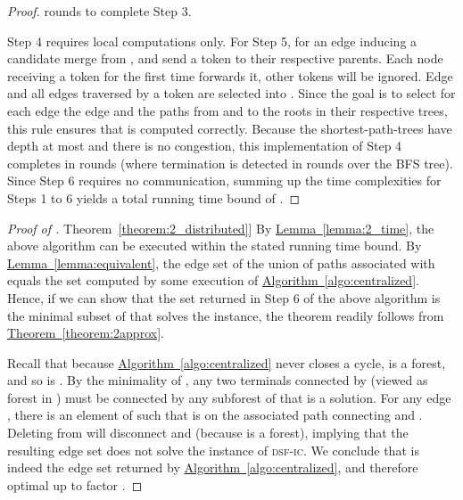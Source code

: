\documentclass[letterpaper,11pt]{article}
\newcommand{\namedref}[2]{\hyperref[#2]{#1~\ref*{#2}}}
\newcommand{\theoremref}[1]{\namedref{Theorem}{#1}}
\newcommand{\lemmaref}[1]{\namedref{Lemma}{#1}}
\newcommand{\algref}[1]{\namedref{Algorithm}{#1}}
\newcommand{\sfic}{\textsc{dsf-ic}\xspace}
\begin{document}
\begin{proof}
rounds to complete Step 3.

Step 4 requires local computations only. For Step 5, for an edge 
inducing a candidate merge from ,  and  send a token to their
respective parents. Each node receiving a token for the first time forwards it,
other tokens will be ignored. Edge  and all edges traversed by a token
are selected into . Since the goal is to select for each edge  the
edge and the paths from  and  to the roots in their respective trees, this
rule ensures that  is computed correctly. Because the shortest-path-trees
have depth at most  and there is no congestion, this implementation of Step 4
completes in  rounds (where termination is detected in
 rounds over the BFS tree). Since Step 6 requires no
communication, summing up the time complexities for Steps 1 to 6 yields a total
running time bound of .
\end{proof}
\begin{proof}[Proof of \theoremref{theorem:2_distributed}]
By \lemmaref{lemma:2_time}, the above algorithm can be executed within the
stated running time bound. By \lemmaref{lemma:equivalent}, the edge set  of
the union of paths associated with  equals the set 
computed by some execution of \algref{algo:centralized}. Hence, if we can show
that the set  returned in Step 6 of the above algorithm is the minimal subset
of  that solves the instance, the theorem readily follows from
\theoremref{theorem:2approx}.

Recall that because \algref{algo:centralized} never closes a cycle,
 is a forest, and so is . By the minimality of ,
any two terminals connected by  (viewed as forest in ) must be
connected by any subforest of  that is a solution. For any edge , there is an element of  such that
 is on the associated path connecting  and . Deleting 
from  will disconnect  and  (because  is a forest), implying that
the resulting edge set does not solve the instance of \sfic. We conclude that
 is indeed the edge set returned by \algref{algo:centralized}, and therefore
optimal up to factor .
\end{proof}
\end{document}
